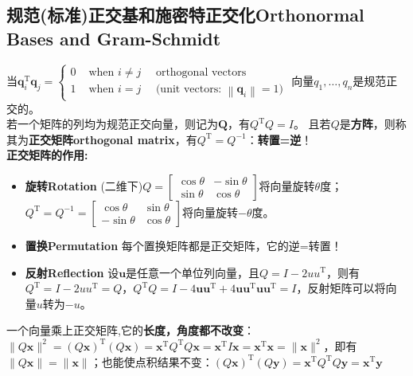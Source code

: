 \documentclass[UTF8]{article}
\begin{document}
    \subsection{规范(标准)正交基和施密特正交化Orthonormal Bases and Gram-Schmidt}
    当$\boldsymbol{q}_{i}^{\mathrm{T}} \boldsymbol{q}_{j}=\left\{\begin{array}{ll}{0} & {\text { when } i \neq j \quad \text { orthogonal vectors }} \\ {1} & {\text { when } i=j \quad \text { (unit vectors: }\left\|\boldsymbol{q}_{i}\right\|=1 )}\end{array}\right.$
    \quad 向量$q_{1}, \dots, q_{n}$是规范正交的。\\
    若一个矩阵的列均为规范正交向量，则记为$\bm{Q}$，有$Q^{\mathrm{T}} Q=I$。 且若$Q$是\textbf{方阵}，则称其为\textbf{正交矩阵orthogonal matrix}，有$Q^{\mathrm{T}}=Q^{-1}$：\textbf{转置=逆}！
    \\
    \textbf{正交矩阵的作用:}
    \begin{itemize}
        \item \textbf{旋转Rotation} \quad (二维下)$Q=\left[\begin{array}{rr}{\cos \theta} & {-\sin \theta} \\ {\sin \theta} & {\cos \theta}\end{array}\right]$将向量旋转$\theta$度； \quad $Q^{\mathrm{T}}=Q^{-1}=\left[\begin{array}{rr}{\cos \theta} & {\sin \theta} \\ {-\sin \theta} & {\cos \theta}\end{array}\right]$将向量旋转$-\theta$度。
        \item \textbf{置换Permutation} \quad 每个置换矩阵都是正交矩阵，它的逆=转置！
        \item \textbf{反射Reflection} \quad 设$\bm{u}$是任意一个单位列向量，且$Q=I-2 u u^{\mathrm{T}}$，则有$Q^{\mathrm{T}}=I-2 u u^{\mathrm{T}}=Q$，$Q^{\mathrm{T}} Q=I-4 \boldsymbol{u u}^{\mathrm{T}}+4 \boldsymbol{u} \boldsymbol{u}^{\mathrm{T}} \boldsymbol{u} \boldsymbol{u}^{\mathrm{T}}=I$，反射矩阵可以将向量$u$转为$-u$。
    \end{itemize}
    一个向量乘上正交矩阵,它的\textbf{长度，角度都不改变}：$\|Q \boldsymbol{x}\|^{2}=(Q \boldsymbol{x})^{\mathrm{T}}(Q \boldsymbol{x})=\boldsymbol{x}^{\mathrm{T}} Q^{\mathrm{T}} Q \boldsymbol{x}=\boldsymbol{x}^{\mathrm{T}} I \boldsymbol{x}=\boldsymbol{x}^{\mathrm{T}} \boldsymbol{x}=\|\boldsymbol{x}\|^{2}$，即有$\|Q \boldsymbol{x}\|=\|\boldsymbol{x}\|$；也能使点积结果不变：$(Q \boldsymbol{x})^{\mathrm{T}}(Q \boldsymbol{y})=\boldsymbol{x}^{\mathrm{T}} Q^{\mathrm{T}} Q \boldsymbol{y}=\boldsymbol{x}^{\mathrm{T}} \boldsymbol{y}$
\end{document}
